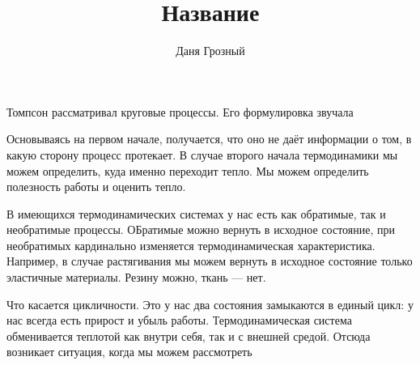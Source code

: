 \documentclass{book}
\title{Название}
\author{Даня Грозный}
\begin{document}
Томпсон рассматривал круговые процессы. Его формулировка звучала

Основываясь на первом начале, получается, что оно не даёт информации о том, в какую сторону процесс протекает. В случае второго начала термодинамики мы можем определить, куда именно переходит тепло. Мы можем определить полезность работы и оценить тепло.

В имеющихся термодинамических системах у нас есть как обратимые, так и необратимые процессы. ОБратимые можно вернуть в исходное состояние, при необратимых кардинально изменяется термодинамическая характеристика. Например, в случае растягивания мы можем вернуть в исходное состояние только эластичные материалы. Резину можно, ткань --- нет.

Что касается цикличности. Это у нас два состояния замыкаются в единый цикл: у нас всегда есть прирост и убыль работы. Термодинамическая система обменивается теплотой как внутри себя, так и с внешней средой. Отсюда возникает ситуация, когда мы можем рассмотреть
\end{document}
